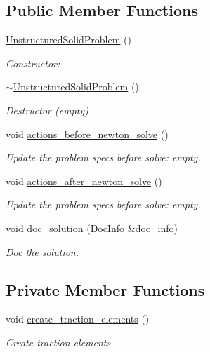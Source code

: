 \subsection*{Public Member Functions}
\begin{DoxyCompactItemize}
\item 
\hyperlink{classUnstructuredSolidProblem_a18ce02b6e4bbc86403c9e1b32c095772}{Unstructured\+Solid\+Problem} ()
\begin{DoxyCompactList}\small\item\em Constructor\+: \end{DoxyCompactList}\item 
\hyperlink{classUnstructuredSolidProblem_a25fe105d949498bf8f7c15aff96a7d00}{$\sim$\+Unstructured\+Solid\+Problem} ()
\begin{DoxyCompactList}\small\item\em Destructor (empty) \end{DoxyCompactList}\item 
void \hyperlink{classUnstructuredSolidProblem_af8139cf00952aaf56cea69ec5859b742}{actions\+\_\+before\+\_\+newton\+\_\+solve} ()
\begin{DoxyCompactList}\small\item\em Update the problem specs before solve\+: empty. \end{DoxyCompactList}\item 
void \hyperlink{classUnstructuredSolidProblem_a57946bc2c0d083d74c3e9416f882f7c0}{actions\+\_\+after\+\_\+newton\+\_\+solve} ()
\begin{DoxyCompactList}\small\item\em Update the problem specs before solve\+: empty. \end{DoxyCompactList}\item 
void \hyperlink{classUnstructuredSolidProblem_ab3d66fd61b69d12b4f159d763fc44f15}{doc\+\_\+solution} (Doc\+Info \&doc\+\_\+info)
\begin{DoxyCompactList}\small\item\em Doc the solution. \end{DoxyCompactList}\end{DoxyCompactItemize}
\subsection*{Private Member Functions}
\begin{DoxyCompactItemize}
\item 
void \hyperlink{classUnstructuredSolidProblem_a9137960284200ed998989f785965f902}{create\+\_\+traction\+\_\+elements} ()
\begin{DoxyCompactList}\small\item\em Create traction elements. \end{DoxyCompactList}\end{DoxyCompactItemize}
